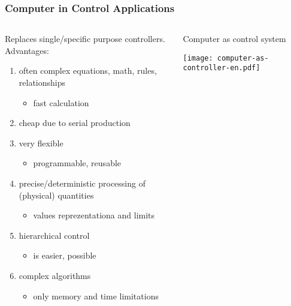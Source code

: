 \documentclass{beamer}
\begin{document}
\begin{frame}
\frametitle{Computer in Control Applications}

\begin{columns}
\begin{column}{0.58\textwidth}
Replaces single/specific purpose controllers. Advantages:
\begin{enumerate}
 \item often complex equations, math, rules, relationships
 \begin{itemize}
  \item fast calculation
 \end{itemize}
 \item cheap due to serial production
 \item very flexible
 \begin{itemize}
  \item programmable, reusable
 \end{itemize}
 \item precise/deterministic processing of (physical) quantities
 \begin{itemize}
  \item values reprezentationa and limits
 \end{itemize}
 \item hierarchical control
 \begin{itemize}
  \item is easier, possible
 \end{itemize}
 \item complex algorithms
 \begin{itemize}
  \item only memory and time limitations
 \end{itemize}
\end{enumerate}
  \vfil
\end{column}
\begin{column}{0.42\textwidth}
  \begin{center}
    Computer as control system

    \vspace{5mm}

    \texttt{[image: computer-as-controller-en.pdf]}
  \end{center}
\end{column}
\end{columns}
\end{frame}
\end{document}
